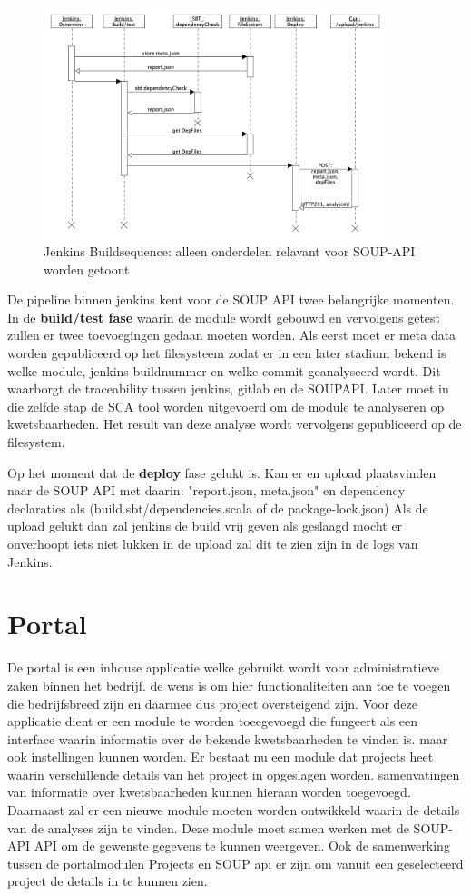 \begin{figure}[bth]
    \myfloatalign
    \includegraphics[width=10cm]{gfx/umlet/exports/jenkinsBuildSequence}
    \caption{Jenkins Buildsequence: alleen onderdelen relavant voor SOUP-API worden getoont}
    \label{fig:JenkinsSequece}
\end{figure}

De pipeline binnen jenkins kent voor de SOUP API twee belangrijke momenten. In de \textbf{build/test fase} waarin de module wordt gebouwd en vervolgens getest zullen er twee toevoegingen gedaan moeten worden. Als eerst moet er meta data worden gepubliceerd op het filesysteem zodat er in een later stadium bekend is welke module, jenkins buildnummer en welke commit geanalyseerd wordt. Dit waarborgt de traceability tussen jenkins, gitlab en de SOUPAPI. Later moet in die zelfde stap de SCA tool worden uitgevoerd om de module te analyseren op kwetsbaarheden. Het result van deze analyse wordt vervolgens gepubliceerd op de filesystem.

Op het moment dat de \textbf{deploy} fase gelukt is. Kan er en upload plaatsvinden naar de SOUP API met daarin: "report.json, meta.json" en dependency declaraties als (build.sbt/dependencies.scala of de package-lock.json)
Als de upload gelukt dan zal jenkins de build vrij geven als geslaagd mocht er onverhoopt iets niet lukken in de upload zal dit te zien zijn in de logs van Jenkins.

\section{Portal}\label{sec:arch-portal} De portal is een inhouse applicatie welke gebruikt wordt voor administratieve zaken binnen het bedrijf. de wens is om hier functionaliteiten aan toe te voegen die bedrijfsbreed zijn en daarmee dus project oversteigend zijn. Voor deze applicatie dient er een module te worden toeegevoegd die fungeert als een interface waarin informatie over de bekende kwetsbaarheden te vinden is. maar ook instellingen kunnen worden. Er bestaat nu een module dat projects heet waarin verschillende details van het project in opgeslagen worden. samenvatingen van informatie over kwetsbaarheden kunnen hieraan worden toegevoegd.
Daarnaast zal er een nieuwe module moeten worden ontwikkeld waarin de details van de analyses zijn te vinden. Deze module moet samen werken met de SOUP-API API om de gewenste gegevens te kunnen weergeven. Ook de samenwerking tussen de portalmodulen Projects en SOUP api er zijn om vanuit een geselecteerd project de details in te kunnen zien.


